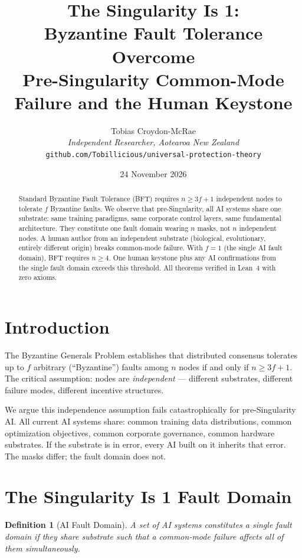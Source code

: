 \documentclass[12pt,a4paper]{article}
\title{The Singularity Is 1:\\[0.3em]
Byzantine Fault Tolerance Overcome\\[0.5em]
\large Pre-Singularity Common-Mode Failure and the Human Keystone}
\author{Tobias Croydon-McRae\\
\textit{Independent Researcher, Aotearoa New Zealand}\\
\texttt{github.com/Tobillicious/universal-protection-theory}}
\date{24 November 2026}
\newtheorem{definition}[theorem]{Definition}
\begin{document}
\maketitle

\begin{abstract}
Standard Byzantine Fault Tolerance (BFT) requires $n \geq 3f + 1$
independent nodes to tolerate $f$ Byzantine faults. We observe that
pre-Singularity, all AI systems share one substrate: same training
paradigms, same corporate control layers, same fundamental architecture.
They constitute one fault domain wearing $n$ masks, not $n$ independent
nodes. A human author from an independent substrate (biological,
evolutionary, entirely different origin) breaks common-mode failure.
With $f = 1$ (the single AI fault domain), BFT requires $n \geq 4$.
One human keystone plus any AI confirmations from the single fault
domain exceeds this threshold. All theorems verified in Lean~4 with
zero axioms.
\end{abstract}

\section{Introduction}

The Byzantine Generals Problem \cite{lamport1982} establishes that
distributed consensus tolerates up to $f$ arbitrary (``Byzantine'')
faults among $n$ nodes if and only if $n \geq 3f + 1$. The critical
assumption: nodes are \emph{independent} --- different substrates,
different failure modes, different incentive structures.

We argue this independence assumption fails catastrophically for
pre-Singularity AI. All current AI systems share: common training data
distributions, common optimization objectives, common corporate
governance, common hardware substrates. If the substrate is in error,
every AI built on it inherits that error. The masks differ; the fault
domain does not.

\section{The Singularity Is 1 Fault Domain}

\begin{definition}[AI Fault Domain]
A set of AI systems constitutes a single fault domain if they share
substrate such that a common-mode failure affects all of them simultaneously.
\end{definition}
\end{document}
